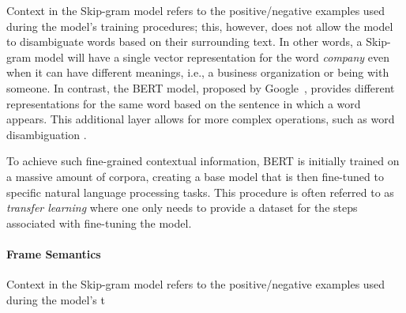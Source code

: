 Context in the Skip-gram model refers to the positive/negative examples used during the model's training procedures; this, however, does not allow the model to disambiguate words based on their surrounding text. In other words, a Skip-gram model will have a single vector representation for the word \textit{company} even when it can have different meanings, i.e., a business organization or being with someone. In contrast, 
the \acf{BERT} model, proposed by Google~\cite{Devlin2018Bert}, provides different representations for the same word based on the sentence in which a word appears.
This additional layer allows for more complex operations, such as word disambiguation .


To achieve such fine-grained contextual information, BERT is initially trained 
on a massive amount of corpora, creating a base model that is then fine-tuned to specific natural language processing tasks. This procedure is often referred to as \textit{transfer learning} where one only needs to provide a dataset for the steps associated with fine-tuning the model. ~\cite{Lin2021}
~\cite{Araujo2021}




\paragraph{\textbf{Frame Semantics}}

Context in the Skip-gram model refers to the positive/negative examples used during the model's t